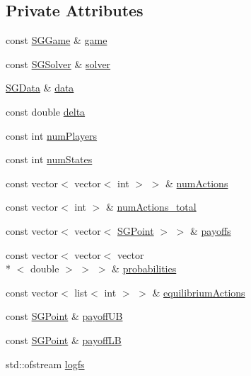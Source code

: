 \subsection*{Private Attributes}
\begin{DoxyCompactItemize}
\item 
const \hyperlink{class_s_g_game}{S\+G\+Game} \& \hyperlink{class_s_g_approximation_a3244a3d7de5f2b909d438f5b4ab337ee}{game}
\item 
const \hyperlink{class_s_g_solver}{S\+G\+Solver} \& \hyperlink{class_s_g_approximation_a0f3be9758c5ee97b4fafd7d15e9f3c88}{solver}
\item 
\hyperlink{class_s_g_data}{S\+G\+Data} \& \hyperlink{class_s_g_approximation_a5b38e362e6520eeb30f1bd446e2fb70e}{data}
\item 
const double \hyperlink{class_s_g_approximation_a2db391ef9ba9edc0313ddfd627bf6d48}{delta}
\item 
const int \hyperlink{class_s_g_approximation_aad4f5b13c4d578cc7a2c9d2290de2524}{num\+Players}
\item 
const int \hyperlink{class_s_g_approximation_a5de424fc814b5770fedc453052d61d3b}{num\+States}
\item 
const vector$<$ vector$<$ int $>$ $>$ \& \hyperlink{class_s_g_approximation_af6ee6afd52c29d6c81f29a4e35c40771}{num\+Actions}
\item 
const vector$<$ int $>$ \& \hyperlink{class_s_g_approximation_abcd0b34194cd55fca5361bb1c6d3a5e3}{num\+Actions\+\_\+total}
\item 
const vector$<$ vector$<$ \hyperlink{class_s_g_point}{S\+G\+Point} $>$ $>$ \& \hyperlink{class_s_g_approximation_aad5b271ff927a7f21080aab138cdd471}{payoffs}
\item 
const vector$<$ vector$<$ vector\\*
$<$ double $>$ $>$ $>$ \& \hyperlink{class_s_g_approximation_a82aefba3c77e331995e53b6692af4ada}{probabilities}
\item 
const vector$<$ list$<$ int $>$ $>$ \& \hyperlink{class_s_g_approximation_a1fffdb10af241d7c2e8591b661435c3d}{equilibrium\+Actions}
\item 
const \hyperlink{class_s_g_point}{S\+G\+Point} \& \hyperlink{class_s_g_approximation_a1b9d13241c1d3757f70099e3d6c279f5}{payoff\+U\+B}
\item 
const \hyperlink{class_s_g_point}{S\+G\+Point} \& \hyperlink{class_s_g_approximation_a730a565edb81ab25cf99b8af3e8781ef}{payoff\+L\+B}
\item 
std\+::ofstream \hyperlink{class_s_g_approximation_a3c938c255cddce7cc0483e223bf09b65}{logfs}

\end{DoxyCompactItemize}

